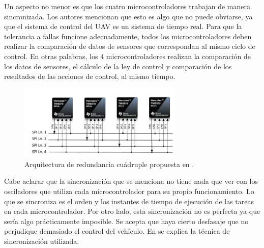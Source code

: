 Un aspecto no menor es que los cuatro microcontroladores trabajan de manera sincronizada. Los autores mencionan que esto es algo que no puede obviarse, ya que el sistema de control del UAV es un sistema de tiempo real. Para que la tolerancia a fallas funcione adecuadamente, todos los microcontroladores deben realizar la comparación de datos de sensores que correspondan al mismo ciclo de control. En otras palabras, los 4 microcontroladores realizan la comparación de los datos de sensores, el cálculo de la ley de control y comparación de los resultados de las acciones de control, al mismo tiempo. %

\begin{figure}[htb]
    \centering
    \includegraphics[width=0.7\textwidth]{img/redundancy_SPI.png}
    \caption{Arquitectura de redundancia cuádruple propuesta en \cite{hiergeist2018implementation}.}
    \label{fig:redundancy_SPI}
\end{figure}


Cabe aclarar que la sincronización que se menciona no tiene nada que ver con los osciladores que utiliza cada microcontrolador para su propio funcionamiento. Lo que se sincroniza es el orden y los instantes de tiempo de ejecución de las tareas en cada microcontrolador. Por otro lado, esta sincronización no es perfecta ya que sería algo prácticamente imposible. Se acepta que haya cierto desfasaje que no perjudique demasiado el control del vehículo. En \cite{hiergeist2018implementation} se explica la técnica de sincronización utilizada.

